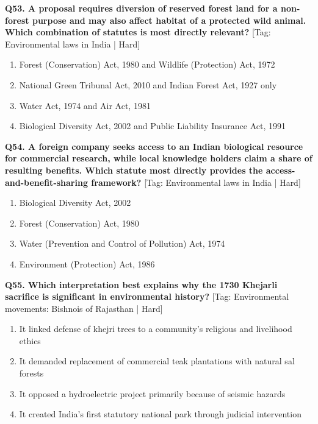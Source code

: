 \noindent\textbf{Q53. A proposal requires diversion of reserved forest land for a non-forest purpose and may also affect habitat of a protected wild animal. Which combination of statutes is most directly relevant?} \hfill [Tag: Environmental laws in India | Hard]
\begin{enumerate}[label=(\alph*),topsep=2pt,itemsep=1pt,partopsep=0pt,parsep=0pt]
    \item {Forest (Conservation) Act, 1980 and Wildlife (Protection) Act, 1972}
    \item {National Green Tribunal Act, 2010 and Indian Forest Act, 1927 only}
    \item {Water Act, 1974 and Air Act, 1981}
    \item {Biological Diversity Act, 2002 and Public Liability Insurance Act, 1991}
\end{enumerate}
\vspace{2mm}

\noindent\textbf{Q54. A foreign company seeks access to an Indian biological resource for commercial research, while local knowledge holders claim a share of resulting benefits. Which statute most directly provides the access-and-benefit-sharing framework?} \hfill [Tag: Environmental laws in India | Hard]
\begin{enumerate}[label=(\alph*),topsep=2pt,itemsep=1pt,partopsep=0pt,parsep=0pt]
    \item {Biological Diversity Act, 2002}
    \item {Forest (Conservation) Act, 1980}
    \item {Water (Prevention and Control of Pollution) Act, 1974}
    \item {Environment (Protection) Act, 1986}
\end{enumerate}
\vspace{2mm}

\noindent\textbf{Q55. Which interpretation best explains why the 1730 Khejarli sacrifice is significant in environmental history?} \hfill [Tag: Environmental movements: Bishnois of Rajasthan | Hard]
\begin{enumerate}[label=(\alph*),topsep=2pt,itemsep=1pt,partopsep=0pt,parsep=0pt]
    \item {It linked defense of khejri trees to a community's religious and livelihood ethics}
    \item {It demanded replacement of commercial teak plantations with natural sal forests}
    \item {It opposed a hydroelectric project primarily because of seismic hazards}
    \item {It created India's first statutory national park through judicial intervention}
\end{enumerate}
\vspace{2mm}

